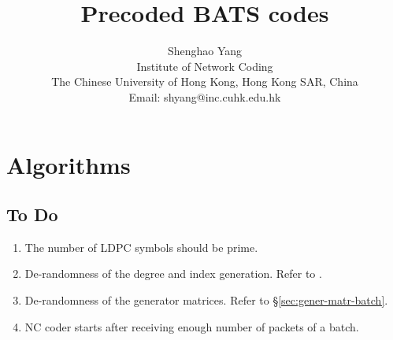 \documentclass{report}
\begin{document}
%
\title{Precoded BATS codes}
%

\author{Shenghao Yang\\
  Institute of Network Coding \\The Chinese University of Hong Kong, Hong Kong SAR,
    China \\Email: shyang@inc.cuhk.edu.hk
}


\maketitle
\tableofcontents

\begin{abstract}
  
\end{abstract}

%

\chapter{Algorithms}

\section{To Do}

\begin{enumerate}
\item The number of LDPC symbols should be prime.
\item De-randomness of the degree and index generation. Refer to
  \cite[\S 5.3.5]{rfc6330}.
\item De-randomness of the generator matrices. Refer to
  \S\ref{sec:gener-matr-batch}.
\item NC coder starts after receiving enough number of packets of a
  batch.
\end{enumerate}
\end{document}
